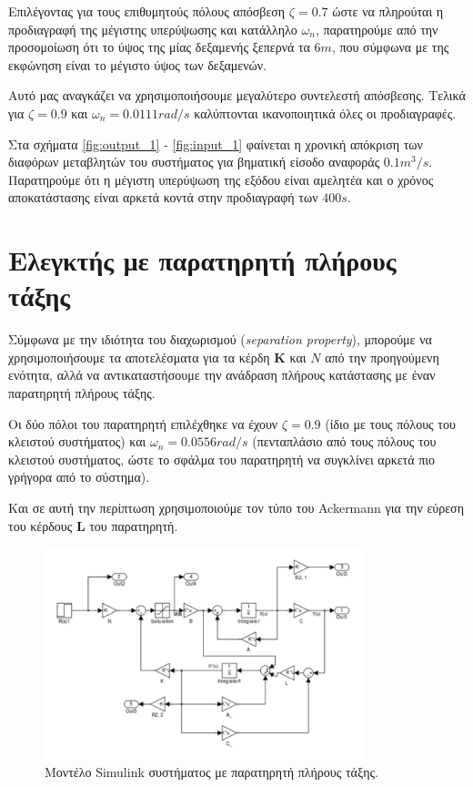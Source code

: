 \documentclass[a4paper, 11pt, english, greek]{article}
\begin{document}
Επιλέγοντας για τους επιθυμητούς πόλους απόσβεση $\zeta = 0.7$ ώστε να πληρούται η προδιαγραφή της μέγιστης υπερύψωσης
και κατάλληλο $ω_n$, παρατηρούμε από την προσομοίωση ότι το ύψος της μίας δεξαμενής ξεπερνά τα $6m$,
που σύμφωνα με της εκφώνηση είναι το μέγιστο ύψος των δεξαμενών.

Αυτό μας αναγκάζει να χρησιμοποιήσουμε μεγαλύτερο συντελεστή απόσβεσης.
Τελικά για $\zeta = 0.9$ και $ω_n = 0.0111 rad/s$ καλύπτονται ικανοποιητικά όλες οι προδιαγραφές.

Στα σχήματα \ref{fig:output_1} - \ref{fig:input_1} φαίνεται η χρονική απόκριση των διαφόρων μεταβλητών του συστήματος για
βηματική είσοδο αναφοράς $0.1 m^3/s$. Παρατηρούμε ότι η μέγιστη υπερύψωση της εξόδου είναι αμελητέα και
ο χρόνος αποκατάστασης είναι αρκετά κοντά στην προδιαγραφή των $400s$.

\section{Ελεγκτής με παρατηρητή πλήρους τάξης}
Σύμφωνα με την ιδιότητα του διαχωρισμού (\textlatin{\emph{separation property}}),
μπορούμε να χρησιμοποιήσουμε τα αποτελέσματα για τα κέρδη $\mathbf{K}$ και $N$ από την προηγούμενη ενότητα,
αλλά να αντικαταστήσουμε την ανάδραση πλήρους κατάστασης με έναν παρατηρητή πλήρους τάξης.

Οι δύο πόλοι του παρατηρητή επιλέχθηκε να έχουν $\zeta = 0.9$ (ίδιο με τους πόλους του κλειστού συστήματος)
και $ω_n = 0.0556 rad/s$ (πενταπλάσιο από τους πόλους του κλειστού συστήματος,
ώστε το σφάλμα του παρατηρητή να συγκλίνει αρκετά πιο γρήγορα από το σύστημα).

Και σε αυτή την περίπτωση χρησιμοποιούμε τον τύπο του \textlatin{Ackermann} για την εύρεση του
κέρδους $\mathbf{L}$ του παρατηρητή.

\begin{figure}[h]
  \centering
  \includegraphics[width=350px]{full_obs}
  \caption{Μοντέλο \textlatin{Simulink} συστήματος με παρατηρητή πλήρους τάξης.}
  \label{fig:full_obs}
\end{figure}
\end{document}
